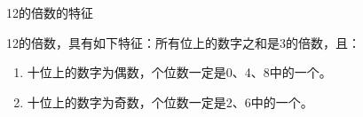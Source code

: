 \documentclass[aspectratio=169]{ctexbeamer} %
\date{\today}
\begin{document}
\begin{frame}[t]{12的倍数的特征}
\begin{spacing}{1.2}
\normalsize
12的倍数，具有如下特征：\alert{所有位上的数字之和是3的倍数，且：}
\begin{enumerate}[label={\arabic*.}]
\item \alert{十位上的数字为偶数，个位数一定是0、4、8中的一个。}
\item \alert{十位上的数字为奇数，个位数一定是2、6中的一个。}
\end{enumerate}

\end{spacing}
\end{frame}
\end{document}

